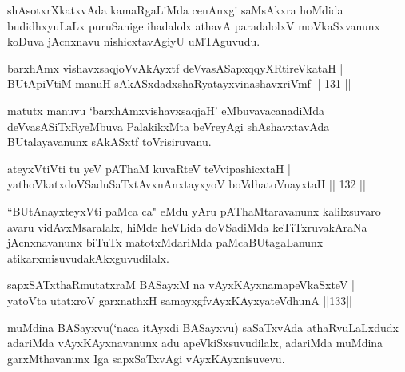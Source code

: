 \begin{artha}
shAsotxrXkatxvAda kamaRgaLiMda cenAnxgi saMsAkxra hoMdida budidhxyuLaLx puruSanige ihadalolx athavA paradalolxV moVkaSxvanunx koDuva jAcnxnavu nishicxtavAgiyU uMTAguvudu.
\end{artha}

\begin{shl}
\footnotemark{}barxhAmx vishavxsaqjoVvAkAyxtf \footnotemark{}deVvasASapxqqyXRtireVkataH |\\
\footnotemark{}BUtApiVtiM manuH sAkASxdadxshaRyatayxvinashavxriVmf \hfill || 131 ||
\end{shl}
\begin{artha}
matutx manuvu `barxhAmxvishavxsaqjaH' eMbuvavacanadiMda deVvasASiTxRyeMbuva PalakikxMta beVreyAgi shAshavxtavAda BUtalayavanunx sAkASxtf toVrisiruvanu.
\end{artha}

\begin{shl}
ateyxVtiVti tu yeV pAThaM kuvaRteV teV\s vipashicxtaH |\\
yathoVkatxdoVSaduSaTxtAvxnAnxtayxyoV boVdhatoV\s nayxtaH \hfill || 132 ||
\end{shl}

\begin{artha}
``BUtAnayxteyxVti paMca ca" eMdu yAru pAThaMtaravanunx kalilxsuvaro avaru vidAvxMsaralalx, hiMde heVLida doVSadiMda keTiTxruvakAraNa jAcnxnavanunx biTuTx matotxMdariMda paMcaBUtagaLanunx atikarxmisuvudakAkxguvudilalx.
\end{artha}

\begin{shl}
sapxSATxthaRmutatxraM BASayxM na vAyxKAyxnamapeVkaSxteV |\\
yatoV\s ta utatxroV garxnathxH samayxgfvAyxKAyxyateV\s dhunA \hfill ||133||
\end{shl}

\begin{artha}
muMdina BASayxvu(`naca \mdash itAyxdi BASayxvu) saSaTxvAda athaRvuLaLxdudx adariMda vAyxKAyxnavanunx adu apeVkiSxsuvudilalx, adariMda muMdina garxMthavanunx Iga sapxSaTxvAgi vAyxKAyxnisuvevu.
\end{artha}

